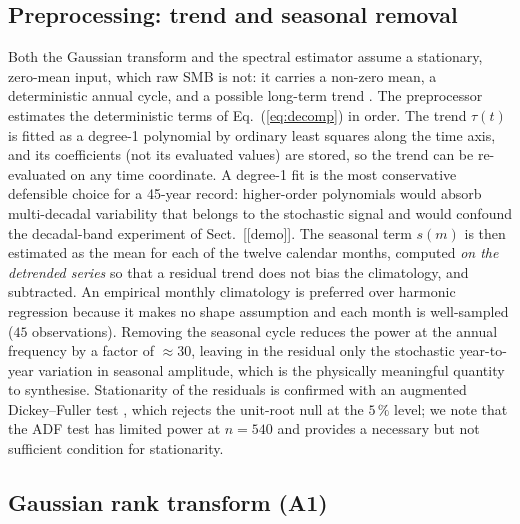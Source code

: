 \subsection{Preprocessing: trend and seasonal removal}\label{sec:pre}

Both the Gaussian transform and the spectral estimator assume a stationary,
zero-mean input, which raw SMB is not: it carries a non-zero mean, a
deterministic annual cycle, and a possible long-term trend
\citep{vonstorch1999,wilks2011}. The preprocessor estimates the deterministic
terms of Eq.~(\ref{eq:decomp}) in order. The trend $\tau(t)$ is fitted as a
degree-1 polynomial by ordinary least squares along the time axis, and its
coefficients (not its evaluated values) are stored, so the trend
can be re-evaluated on any time coordinate. A degree-1 fit is the most
conservative defensible choice for a 45-year record: higher-order
polynomials would absorb multi-decadal variability that belongs to the
stochastic signal and would confound the decadal-band experiment of
Sect.~[[demo]]. The seasonal term $s(m)$ is then estimated as the mean for
each of the twelve calendar months, computed \emph{on the detrended series}
so that a residual trend does not bias the climatology, and subtracted. An
empirical monthly climatology is preferred over harmonic regression because
it makes no shape assumption and each month is well-sampled ($45$
observations). Removing the seasonal cycle reduces the power at the annual
frequency by a factor of $\approx30$, leaving in the residual only the
stochastic year-to-year variation in seasonal amplitude, which is the
physically meaningful quantity to synthesise. Stationarity of the residuals
is confirmed with an augmented Dickey--Fuller test
\citep{dickey1979,said1984}, which rejects the unit-root null at the
$5\,\%$ level; we note that the ADF test has limited power at $n=540$ and
provides a necessary but not sufficient condition for stationarity.

\subsection{Gaussian rank transform (A1)}\label{sec:gt}


